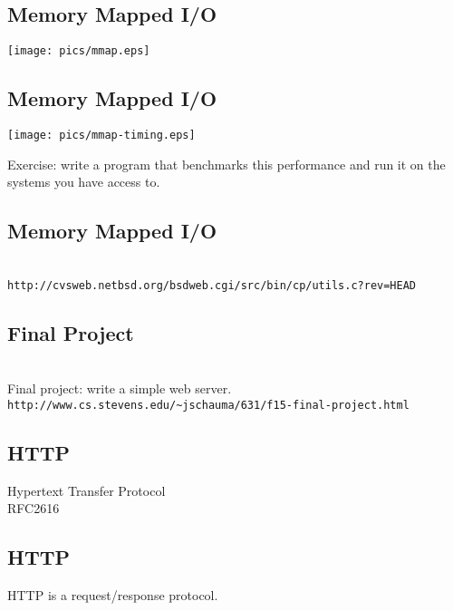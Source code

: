 \documentclass[xga]{xdvislides}
\begin{document}
\subsection{Memory Mapped I/O}
\begin{center}
	\texttt{[image: pics/mmap.eps]}
\end{center}

\subsection{Memory Mapped I/O}
\begin{center}
	\texttt{[image: pics/mmap-timing.eps]}
\end{center}
\addvspace{.5in}
Exercise: write a program that benchmarks this performance and run it on
the systems you have access to.

\subsection{Memory Mapped I/O}
\\
\vspace*{\fill}
\verb+http://cvsweb.netbsd.org/bsdweb.cgi/src/bin/cp/utils.c?rev=HEAD+
\vspace*{\fill}

\subsection{Final Project}
\\
\vspace*{\fill}
Final project: write a simple web server. \\
{\tt http://www.cs.stevens.edu/\~{}jschauma/631/f15-final-project.html}
\vspace*{\fill}

\subsection{HTTP}
\vspace{.5in}
\begin{center}
	\Huge
	Hypertext Transfer Protocol
	\\
	\vspace{.5in}
	RFC2616
\end{center}
\Normalsize

\subsection{HTTP}
\vspace{.5in}
\begin{center}
	\Huge
	HTTP is a request/response protocol.
\end{center}
\Normalsize
\end{document}
